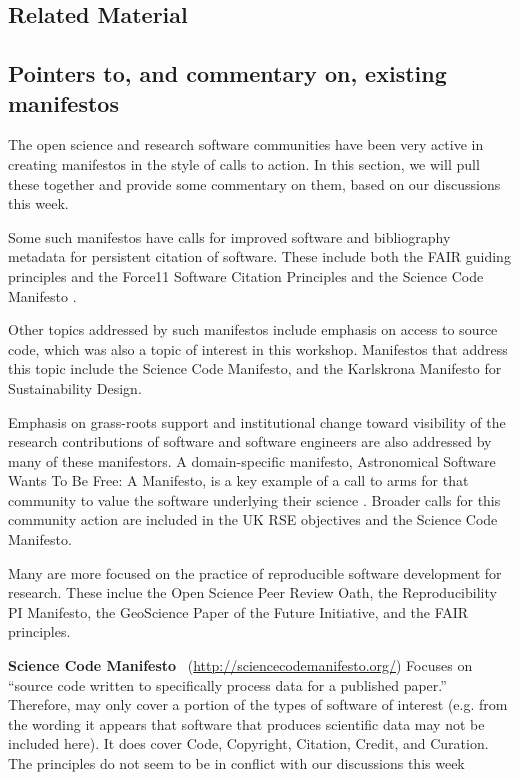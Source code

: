 \documentclass[a4paper,UKenglish]{dagman}
\newcommand{\manifesto}[1]{{\bf #1}\xspace}
\begin{document}
\begin{appendix}
\section{Related Material}

\subsection*{Pointers to, and commentary on, existing manifestos}
The open science and research software communities have been very active in creating manifestos in the style of calls to action. In this section, we will pull these together and provide some commentary on them, based on our discussions this week.

Some such manifestos have calls for improved software and bibliography metadata for persistent citation of software. These include both the FAIR guiding principles and the Force11 Software Citation Principles and the Science Code Manifesto \cite{wilkinson_fair_2016,arfon_m._smith_software_2016,nick_barnes_science_2013}.

Other topics addressed by such manifestos include emphasis on access to source code, which was also a topic of interest in this workshop. Manifestos that address this topic include the Science Code Manifesto, and the Karlskrona Manifesto for Sustainability Design. 

Emphasis on grass-roots support and institutional change toward visibility of the research contributions of software and software engineers are also addressed by many of these manifestors. A domain-specific manifesto, Astronomical Software Wants To Be Free: A Manifesto, is a key example of a call to arms for that community to value the software underlying their science \cite{weiner_astronomical_2009}. Broader calls for this community action are included in the  UK RSE objectives and the Science Code Manifesto.

Many are more focused on the practice of reproducible software development for research. These inclue the Open Science Peer Review Oath, the Reproducibility PI Manifesto, the GeoScience Paper of the Future Initiative, and the FAIR principles. 


\manifesto{Science Code Manifesto}~\cite{nick_barnes_science_2013}
(\url{http://sciencecodemanifesto.org/})
Focuses on ``source code written to specifically process data for a published paper.''
Therefore, may only cover a portion of the types of software of interest (e.g. from the wording it appears that software that produces scientific data may not be included here).
It does cover Code, Copyright, Citation, Credit, and Curation.
The principles do not seem to be in conflict with our discussions this week


\end{appendix}
\end{document}
